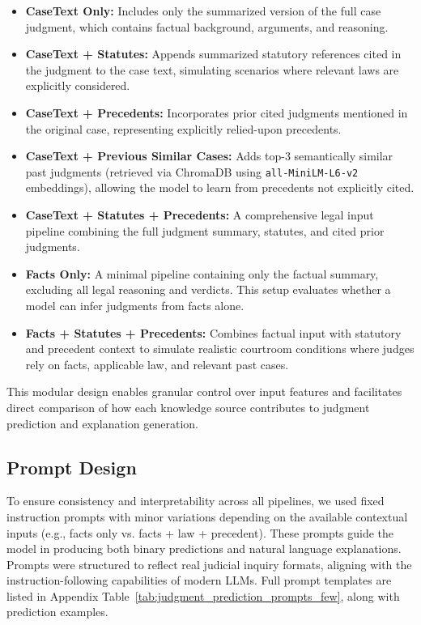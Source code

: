 \begin{itemize}
    \item \textbf{CaseText Only:} Includes only the summarized version of the full case judgment, which contains factual background, arguments, and reasoning.

    \item \textbf{CaseText + Statutes:} Appends summarized statutory references cited in the judgment to the case text, simulating scenarios where relevant laws are explicitly considered.

    \item \textbf{CaseText + Precedents:} Incorporates prior cited judgments mentioned in the original case, representing explicitly relied-upon precedents.

    \item \textbf{CaseText + Previous Similar Cases:} Adds top-3 semantically similar past judgments (retrieved via ChromaDB using \texttt{all-MiniLM-L6-v2} embeddings), allowing the model to learn from precedents not explicitly cited.

    \item \textbf{CaseText + Statutes + Precedents:} A comprehensive legal input pipeline combining the full judgment summary, statutes, and cited prior judgments.

    \item \textbf{Facts Only:} A minimal pipeline containing only the factual summary, excluding all legal reasoning and verdicts. This setup evaluates whether a model can infer judgments from facts alone.

    \item \textbf{Facts + Statutes + Precedents:} Combines factual input with statutory and precedent context to simulate realistic courtroom conditions where judges rely on facts, applicable law, and relevant past cases.
\end{itemize}

This modular design enables granular control over input features and facilitates direct comparison of how each knowledge source contributes to judgment prediction and explanation generation.

\subsection{Prompt Design}
\label{subsec:prompts}
To ensure consistency and interpretability across all pipelines, we used fixed instruction prompts with minor variations depending on the available contextual inputs (e.g., facts only vs. facts + law + precedent). These prompts guide the model in producing both binary predictions and natural language explanations. Prompts were structured to reflect real judicial inquiry formats, aligning with the instruction-following capabilities of modern LLMs. Full prompt templates are listed in Appendix Table~\ref{tab:judgment_prediction_prompts_few}, along with prediction examples.

